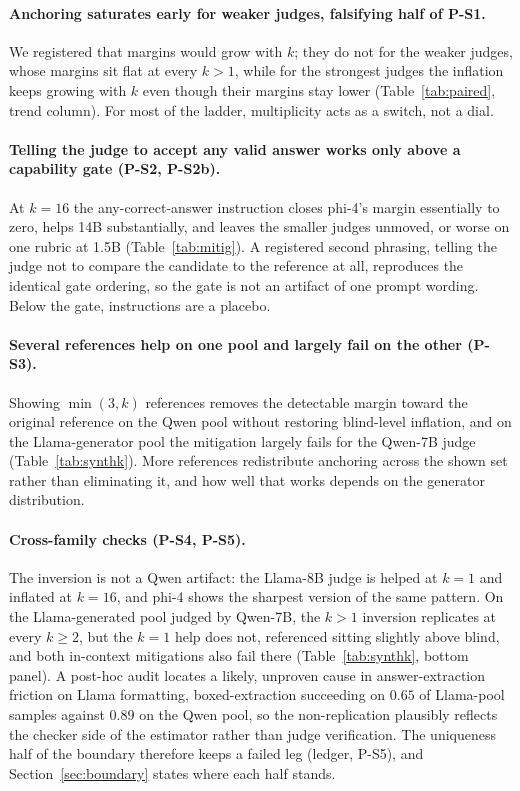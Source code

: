 \documentclass[11pt]{article}
\begin{document}
\paragraph{Anchoring saturates early for weaker judges, falsifying half of P-S1.}
We registered that margins would grow with $k$; they do not for the weaker judges, whose margins sit flat at every $k > 1$, while for the strongest judges the inflation keeps growing with $k$ even though their margins stay lower (Table~\ref{tab:paired}, trend column).
For most of the ladder, multiplicity acts as a switch, not a dial.

\paragraph{Telling the judge to accept any valid answer works only above a capability gate (P-S2, P-S2b).}
At $k{=}16$ the any-correct-answer instruction closes phi-4's margin essentially to zero, helps 14B substantially, and leaves the smaller judges unmoved, or worse on one rubric at 1.5B (Table~\ref{tab:mitig}).
A registered second phrasing, telling the judge not to compare the candidate to the reference at all, reproduces the identical gate ordering, so the gate is not an artifact of one prompt wording.
Below the gate, instructions are a placebo.

\paragraph{Several references help on one pool and largely fail on the other (P-S3).}
Showing $\min(3, k)$ references removes the detectable margin toward the original reference on the Qwen pool without restoring blind-level inflation, and on the Llama-generator pool the mitigation largely fails for the Qwen-7B judge (Table~\ref{tab:synthk}).
More references redistribute anchoring across the shown set rather than eliminating it, and how well that works depends on the generator distribution.

\paragraph{Cross-family checks (P-S4, P-S5).}
The inversion is not a Qwen artifact: the Llama-8B judge is helped at $k{=}1$ and inflated at $k{=}16$, and phi-4 shows the sharpest version of the same pattern.
On the Llama-generated pool judged by Qwen-7B, the $k > 1$ inversion replicates at every $k \ge 2$, but the $k{=}1$ help does not, referenced sitting slightly above blind, and both in-context mitigations also fail there (Table~\ref{tab:synthk}, bottom panel).
A post-hoc audit locates a likely, unproven cause in answer-extraction friction on Llama formatting, boxed-extraction succeeding on $0.65$ of Llama-pool samples against $0.89$ on the Qwen pool, so the non-replication plausibly reflects the checker side of the estimator rather than judge verification.
The uniqueness half of the boundary therefore keeps a failed leg (ledger, P-S5), and Section~\ref{sec:boundary} states where each half stands.
\end{document}
